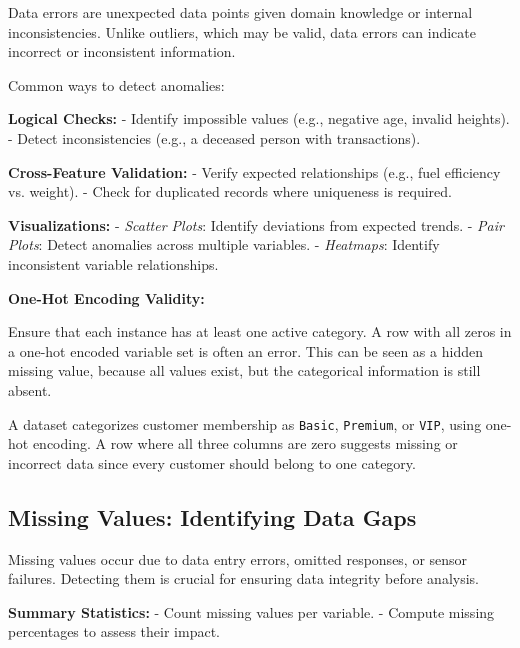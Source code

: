 \documentclass[12pt,openany]{book}
\begin{document}
Data errors are unexpected data points given domain knowledge or internal inconsistencies. Unlike outliers, which may be valid, data errors can indicate incorrect or inconsistent information.
\newline

Common ways to detect anomalies:
\newline

\textbf{Logical Checks:}
- Identify impossible values (e.g., negative age, invalid heights).
- Detect inconsistencies (e.g., a deceased person with transactions).
\newline

\textbf{Cross-Feature Validation:}
- Verify expected relationships (e.g., fuel efficiency vs. weight).
- Check for duplicated records where uniqueness is required.
\newline

\textbf{Visualizations:}
- \textit{Scatter Plots}: Identify deviations from expected trends.
- \textit{Pair Plots}: Detect anomalies across multiple variables.
- \textit{Heatmaps}: Identify inconsistent variable relationships.
\newline

\textbf{One-Hot Encoding Validity:}

Ensure that each instance has at least one active category. A row with all zeros in a one-hot encoded variable set is often an error. This can be seen as a hidden missing value, because all values exist, but the categorical information is still absent.

\begin{examplebox}
A dataset categorizes customer membership as \texttt{Basic}, \texttt{Premium}, or \texttt{VIP}, using one-hot encoding. A row where all three columns are zero suggests missing or incorrect data since every customer should belong to one category.
\end{examplebox}


\subsection{Missing Values: Identifying Data Gaps}

Missing values occur due to data entry errors, omitted responses, or sensor failures. 
Detecting them is crucial for ensuring data integrity before analysis.
\newline

\textbf{Summary Statistics:}  
\newline
- Count missing values per variable.  
- Compute missing percentages to assess their impact.  
\newline
\end{document}
